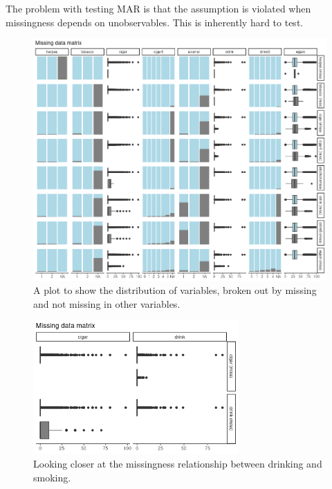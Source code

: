 \documentclass[12pt]{article}
\begin{document}
The problem with testing MAR is that the assumption is violated when missingness depends on unobservables. This is inherently hard to test.

\begin{figure}[h!]
\centering
\includegraphics[width=\textwidth]{2b-missing_plots.png}
\caption{A plot to show the distribution of variables, broken out by missing and not missing in other variables.}
\label{fig-2b1}
\end{figure}

\begin{figure}[h!]
\centering
\includegraphics[width=0.7\textwidth]{2b-missing_plots_cigar-vs-drink.png}
\caption{Looking closer at the missingness relationship between drinking and smoking.}
\label{fig-2b2}
\end{figure}
\FloatBarrier



\vem
{}
\end{document}
